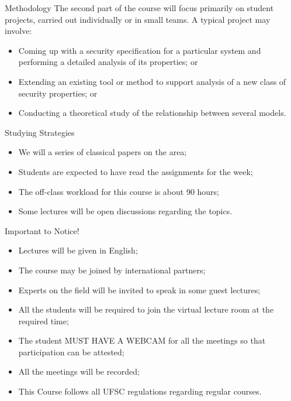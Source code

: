 \documentclass[12pt]{beamer}
\begin{document}
\begin{frame}{Methodology}
The second part of the course will focus primarily on student projects, carried out individually or in small teams. A typical project may involve:\pause
\begin{itemize}
\item Coming up with a security specification for a particular system and performing a detailed analysis of its properties; or\pause
\item Extending an existing tool or method to support analysis of a new class of security properties; or\pause
\item Conducting a theoretical study of the relationship between several models.
\end{itemize}
\end{frame}

\begin{frame}{Studying Strategies}
\begin{itemize}
\item We will a series of classical papers on the area;\pause
\item Students are expected to have read the assignments for the week;\pause
\item The off-class workload for this course is about 90 hours;\pause
\item Some lectures will be open discussions regarding the topics.
\end{itemize}
\end{frame}

\begin{frame}{Important to Notice!}
\begin{itemize}
\item Lectures will be given in English;\pause
\item The course may be joined by international partners;\pause
\item Experts on the field will be invited to speak in some guest lectures;\pause
\item All the students will be required to join the virtual lecture room at the required time;\pause
\item The student MUST HAVE A WEBCAM for all the meetings so that participation can be attested;\pause
\item All the meetings will be recorded;\pause
\item This Course follows all UFSC regulations regarding regular courses.
\end{itemize}
\end{frame}
\end{document}
